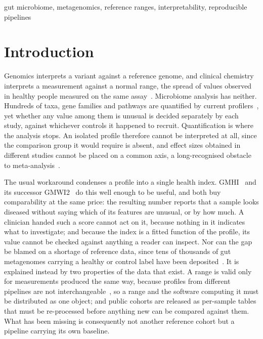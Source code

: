 \documentclass[conference]{IEEEtran}
\begin{document}
\begin{IEEEkeywords}
gut microbiome, metagenomics, reference ranges, interpretability, reproducible pipelines
\end{IEEEkeywords}

\section{Introduction}

Genomics interprets a variant against a reference genome, and clinical chemistry interprets a measurement against a normal range, the spread of values observed in healthy people measured on the same assay~\cite{horn2003}. Microbiome analysis has neither. Hundreds of taxa, gene families and pathways are quantified by current profilers~\cite{beghini2021,richardson2023}, yet whether any value among them is unusual is decided separately by each study, against whichever controls it happened to recruit. Quantification is where the analysis stops. An isolated profile therefore cannot be interpreted at all, since the comparison group it would require is absent, and effect sizes obtained in different studies cannot be placed on a common axis, a long-recognised obstacle to meta-analysis~\cite{duvallet2017}.

The usual workaround condenses a profile into a single health index. GMHI~\cite{gupta2020} and its successor GMWI2~\cite{chang2024} do this well enough to be useful, and both buy comparability at the same price: the resulting number reports that a sample looks diseased without saying which of its features are unusual, or by how much. A clinician handed such a score cannot act on it, because nothing in it indicates what to investigate; and because the index is a fitted function of the profile, its value cannot be checked against anything a reader can inspect. Nor can the gap be blamed on a shortage of reference data, since tens of thousands of gut metagenomes carrying a healthy or control label have been deposited~\cite{richardson2023,antonello2025}. It is explained instead by two properties of the data that exist. A range is valid only for measurements produced the same way, because profiles from different pipelines are not interchangeable~\cite{sczyrba2017}, so a range and the software computing it must be distributed as one object; and public cohorts are released as per-sample tables that must be re-processed before anything new can be compared against them. What has been missing is consequently not another reference cohort but a pipeline carrying its own baseline.
\end{document}
